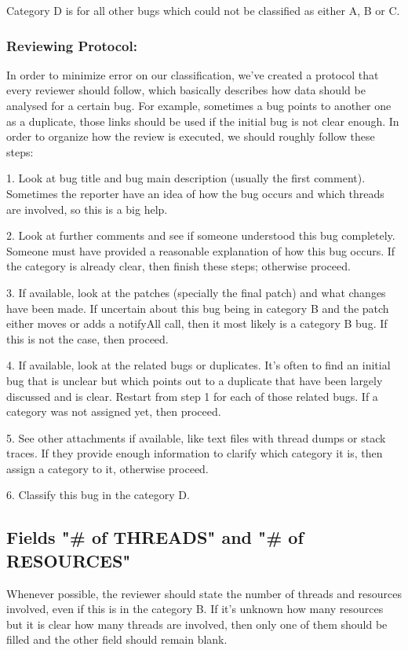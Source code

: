 Category D is for all other bugs which could not be classified as either A, B or C.

\subsubsection{Reviewing Protocol:} 

In order to minimize error on our classification, we've created a protocol that every reviewer should follow, which basically describes how data should be analysed for a certain bug. For example, sometimes a bug points to another one as a duplicate, those links should be used if the initial bug is not clear enough. In order to organize how the review is executed, we should roughly follow these steps:

1. Look at bug title and bug main description (usually the first comment). Sometimes the reporter have an idea of how the bug occurs and which threads are involved, so this is a big help.

2. Look at further comments and see if someone understood this bug completely. Someone must have provided a reasonable explanation of how this bug occurs. If the category is already clear, then finish these steps; otherwise proceed.

3. If available, look at the patches (specially the final patch) and what changes have been made. If uncertain about this bug being in category B and the patch either moves or adds a notifyAll call, then it most likely is a category B bug. If this is not the case, then proceed.

4. If available, look at the related bugs or duplicates. It's often to find an initial bug that is unclear but which points out to a duplicate that have been largely discussed and is clear. Restart from step 1 for each of those related bugs. If a category was not assigned yet, then proceed.

5. See other attachments if available, like text files with thread dumps or stack traces. If they provide enough information to clarify which category it is, then assign a category to it, otherwise proceed.

6. Classify this bug in the category D.


\subsection{Fields "\# of THREADS" and "\# of RESOURCES"}

Whenever possible, the reviewer should state the number of threads and resources involved, even if this is in the category B. If it's unknown how many resources but it is clear how many threads are involved, then only one of them should be filled and the other field should remain blank.

